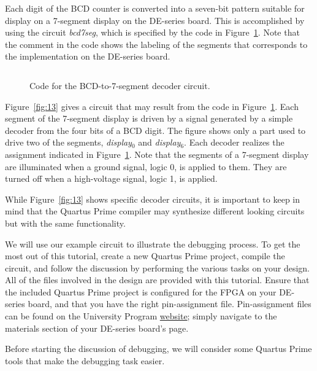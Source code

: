 \documentclass[11pt, twoside, pdftex]{article}
\begin{document}
Each digit of the BCD counter is converted into a seven-bit pattern suitable for display
on a 7-segment display on the DE-series board. This is accomplished by using the circuit 
{\it bcd7seg}, which is specified by the code in Figure~\ref{fig:12}. Note that the comment in the code 
shows the labeling of the segments that corresponds to the implementation on the DE-series board.
 
\begin{figure}
\begin{center} %
\begin{tabular}{c}

\end{tabular}
\end{center}
	\caption{Code for the BCD-to-7-segment decoder circuit.}
	\label{fig:12}
\end{figure}
 

Figure~\ref{fig:13} gives a circuit that may result from the code in Figure~\ref{fig:12}.
Each segment of the 7-segment display is driven by a signal generated
by a simple decoder from the four bits of a BCD digit. The figure shows
only a part used to drive two of the segments, {\it display}$_0$ 
and {\it display}$_6$.
Each decoder realizes the assignment indicated in Figure~\ref{fig:12}.
Note that the segments of a 7-segment display are illuminated when a ground
signal, logic 0, is applied to them. They are turned off when a high-voltage
signal, logic 1, is applied.

While Figure~\ref{fig:13} shows specific decoder circuits, it is important to keep in mind
that the Quartus Prime compiler may synthesize different looking circuits but with
the same functionality.
 
We will use our example circuit to illustrate the debugging process.
To get the most out of this tutorial, create a new Quartus Prime project,
compile the circuit, and follow the discussion by performing the various
tasks on your design. All of the files involved in the design are provided
with this tutorial. Ensure that the included Quartus Prime project is configured for the FPGA on your DE-series board, and that you have the right pin-assignment file. Pin-assignment files can be found on the University Program \href{https://www.altera.com/support/training/university/boards.html}{website}; simply navigate to the materials section of your DE-series board's page.

Before starting the discussion of debugging, we will consider some Quartus Prime 
tools that make the debugging task easier.    
\end{document}
